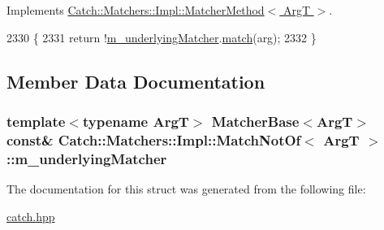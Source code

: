 Implements \hyperlink{struct_catch_1_1_matchers_1_1_impl_1_1_matcher_method_ae0920ff9e817acf08e1bb0cbcb044e30}{Catch\-::\-Matchers\-::\-Impl\-::\-Matcher\-Method$<$ Arg\-T $>$}.


\begin{DoxyCode}
2330                                                            \{
2331                     \textcolor{keywordflow}{return} !\hyperlink{struct_catch_1_1_matchers_1_1_impl_1_1_match_not_of_af7ac67f112b0e93796b048a47329aad4}{m\_underlyingMatcher}.\hyperlink{struct_catch_1_1_matchers_1_1_impl_1_1_matcher_method_ae0920ff9e817acf08e1bb0cbcb044e30}{match}(arg);
2332                 \}
\end{DoxyCode}


\subsection{Member Data Documentation}
\hypertarget{struct_catch_1_1_matchers_1_1_impl_1_1_match_not_of_af7ac67f112b0e93796b048a47329aad4}{
\subsubsection[{m\-\_\-underlying\-Matcher}]{\setlength{\rightskip}{0pt plus 5cm}template$<$typename Arg\-T$>$ {\bf Matcher\-Base}$<$Arg\-T$>$ const\& {\bf Catch\-::\-Matchers\-::\-Impl\-::\-Match\-Not\-Of}$<$ Arg\-T $>$\-::m\-\_\-underlying\-Matcher}}\label{struct_catch_1_1_matchers_1_1_impl_1_1_match_not_of_af7ac67f112b0e93796b048a47329aad4}


The documentation for this struct was generated from the following file\-:\begin{DoxyCompactItemize}
\item 
\hyperlink{catch_8hpp}{catch.\-hpp}\end{DoxyCompactItemize}
